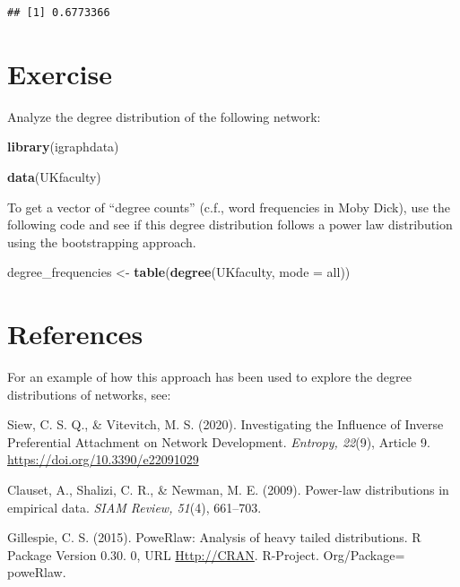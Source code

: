 \documentclass[
]{book}
\newenvironment{Shaded}{\begin{snugshade}}{\end{snugshade}}
\newcommand{\AttributeTok}[1]{\textcolor[rgb]{0.13,0.29,0.53}{#1}}
\newcommand{\FunctionTok}[1]{\textcolor[rgb]{0.13,0.29,0.53}{\textbf{#1}}}
\newcommand{\NormalTok}[1]{#1}
\newcommand{\OtherTok}[1]{\textcolor[rgb]{0.56,0.35,0.01}{#1}}
\newcommand{\StringTok}[1]{\textcolor[rgb]{0.31,0.60,0.02}{#1}}
\begin{document}
\begin{verbatim}
## [1] 0.6773366
\end{verbatim}

\section{Exercise}\label{exercise-9}

Analyze the degree distribution of the following network:

\begin{Shaded}
\begin{Highlighting}[]
\FunctionTok{library}\NormalTok{(igraphdata)}

\FunctionTok{data}\NormalTok{(}\StringTok{\textquotesingle{}UKfaculty\textquotesingle{}}\NormalTok{)}
\end{Highlighting}
\end{Shaded}

To get a vector of ``degree counts'' (c.f., word frequencies in Moby Dick), use the following code and see if this degree distribution follows a power law distribution using the bootstrapping approach.

\begin{Shaded}
\begin{Highlighting}[]
\NormalTok{degree\_frequencies }\OtherTok{\textless{}{-}} \FunctionTok{table}\NormalTok{(}\FunctionTok{degree}\NormalTok{(UKfaculty, }\AttributeTok{mode =} \StringTok{\textquotesingle{}all\textquotesingle{}}\NormalTok{))}
\end{Highlighting}
\end{Shaded}

\section{References}\label{references-3}

For an example of how this approach has been used to explore the degree distributions of networks, see:

Siew, C. S. Q., \& Vitevitch, M. S. (2020). Investigating the Influence of Inverse Preferential Attachment on Network Development. \emph{Entropy, 22}(9), Article 9. \url{https://doi.org/10.3390/e22091029}

Clauset, A., Shalizi, C. R., \& Newman, M. E. (2009). Power-law distributions in empirical data. \emph{SIAM Review, 51}(4), 661--703.

Gillespie, C. S. (2015). PoweRlaw: Analysis of heavy tailed distributions. R Package Version 0.30. 0, URL \url{Http://CRAN}. R-Project. Org/Package= poweRlaw.

  
\end{document}
